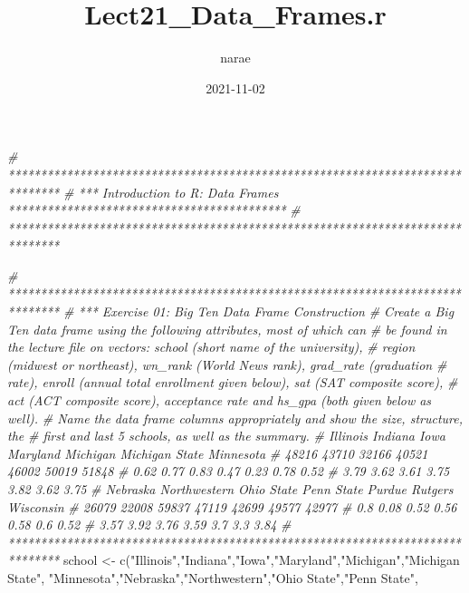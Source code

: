 \documentclass[
]{article}
\title{Lect21\_Data\_Frames.r}
\author{narae}
\date{2021-11-02}
\newenvironment{Shaded}{\begin{snugshade}}{\end{snugshade}}
\newcommand{\CommentTok}[1]{\textcolor[rgb]{0.56,0.35,0.01}{\textit{#1}}}
\newcommand{\FunctionTok}[1]{\textcolor[rgb]{0.00,0.00,0.00}{#1}}
\newcommand{\NormalTok}[1]{#1}
\newcommand{\OtherTok}[1]{\textcolor[rgb]{0.56,0.35,0.01}{#1}}
\newcommand{\StringTok}[1]{\textcolor[rgb]{0.31,0.60,0.02}{#1}}
\begin{document}
\maketitle

\begin{Shaded}
\begin{Highlighting}[]
\CommentTok{\# ******************************************************************************}
\CommentTok{\# *** Introduction to R: Data Frames *******************************************}
\CommentTok{\# ******************************************************************************}

\CommentTok{\# ******************************************************************************}
\CommentTok{\# *** Exercise 01: Big Ten Data Frame Construction}
\CommentTok{\# Create a Big Ten data frame using the following attributes, most of which can}
\CommentTok{\# be found in the lecture file on vectors: school (short name of the university), }
\CommentTok{\# region (midwest or northeast), wn\_rank (World News rank), grad\_rate (graduation }
\CommentTok{\# rate), enroll (annual total enrollment given below), sat (SAT composite score), }
\CommentTok{\# act (ACT composite score), acceptance rate and hs\_gpa (both given below as well).}
\CommentTok{\# Name the data frame columns appropriately and show the size, structure, the}
\CommentTok{\# first and last 5 schools, as well as the summary.}
\CommentTok{\# Illinois  Indiana   Iowa    Maryland  Michigan  Michigan State Minnesota      }
\CommentTok{\#  48216    43710     32166   40521     46002         50019         51848}
\CommentTok{\#   0.62    0.77      0.83    0.47  0.23          0.78       0.52   }
\CommentTok{\#   3.79    3.62      3.61    3.75  3.82          3.62       3.75   }
\CommentTok{\# Nebraska  Northwestern    Ohio State  Penn State  Purdue  Rutgers Wisconsin }
\CommentTok{\# 26079         22008           59837         47119     42699   49577   42977}
\CommentTok{\# 0.8           0.08            0.52          0.56      0.58    0.6     0.52}
\CommentTok{\# 3.57          3.92            3.76          3.59      3.7     3.3     3.84            }
\CommentTok{\# ******************************************************************************}
\NormalTok{school }\OtherTok{\textless{}{-}} \FunctionTok{c}\NormalTok{(}\StringTok{"Illinois"}\NormalTok{,}\StringTok{"Indiana"}\NormalTok{,}\StringTok{"Iowa"}\NormalTok{,}\StringTok{"Maryland"}\NormalTok{,}\StringTok{"Michigan"}\NormalTok{,}\StringTok{"Michigan State"}\NormalTok{,}
            \StringTok{"Minnesota"}\NormalTok{,}\StringTok{"Nebraska"}\NormalTok{,}\StringTok{"Northwestern"}\NormalTok{,}\StringTok{"Ohio State"}\NormalTok{,}\StringTok{"Penn State"}\NormalTok{,}

\end{Highlighting}
\end{Shaded}
\end{document}
